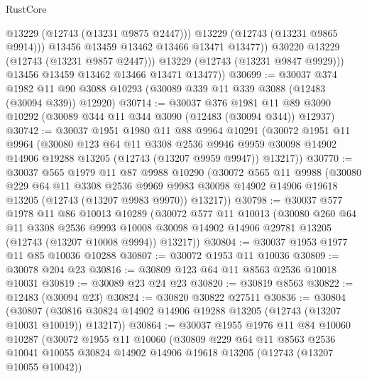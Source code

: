 \begin{lexlean}{RustCore}
\begin{coremodule}
                    @13229
                    (@12743 (@13231 @9875 @2447)))
                  @13229
                  (@12743 (@13231 @9865 @9914)))
                @13456
                @13459
                @13462
                @13466
                @13471
                @13477))
            @30220
            @13229
            (@12743 (@13231 @9857 @2447)))
          @13229
          (@12743 (@13231 @9847 @9929)))
        @13456
        @13459
        @13462
        @13466
        @13471
        @13477))
@30699 := @30037
    @374
    @1982
    @11
    @90
    @3088
    @10293
    (@30089 @339 @11 @339 @3088 (@12483 (@30094 @339)) @12920)
@30714 := @30037
    @376
    @1981
    @11
    @89
    @3090
    @10292
    (@30089 @344 @11 @344 @3090 (@12483 (@30094 @344)) @12937)
@30742 := @30037
    @1951
    @1980
    @11
    @88
    @9964
    @10291
    (@30072
      @1951
      @11
      @9964
      (@30080
        @123
        @64
        @11
        @3308
        @2536
        @9946
        @9959
        @30098
        @14902
        @14906
        @19288
        @13205
        (@12743 (@13207 @9959 @9947))
        @13217))
@30770 := @30037
    @565
    @1979
    @11
    @87
    @9988
    @10290
    (@30072
      @565
      @11
      @9988
      (@30080
        @229
        @64
        @11
        @3308
        @2536
        @9969
        @9983
        @30098
        @14902
        @14906
        @19618
        @13205
        (@12743 (@13207 @9983 @9970))
        @13217))
@30798 := @30037
    @577
    @1978
    @11
    @86
    @10013
    @10289
    (@30072
      @577
      @11
      @10013
      (@30080
        @260
        @64
        @11
        @3308
        @2536
        @9993
        @10008
        @30098
        @14902
        @14906
        @29781
        @13205
        (@12743 (@13207 @10008 @9994))
        @13217))
@30804 := @30037 @1953 @1977 @11 @85 @10036 @10288
@30807 := @30072 @1953 @11 @10036
@30809 := @30078 @204 @23
@30816 := @30809 @123 @64 @11 @8563 @2536 @10018 @10031
@30819 := @30089 @23 @24 @23
@30820 := @30819 @8563
@30822 := @12483 (@30094 @23)
@30824 := @30820 @30822 @27511
@30836 := @30804
    (@30807 (@30816 @30824 @14902 @14906 @19288 @13205 (@12743 (@13207 @10031 @10019)) @13217))
@30864 := @30037
    @1955
    @1976
    @11
    @84
    @10060
    @10287
    (@30072
      @1955
      @11
      @10060
      (@30809
        @229
        @64
        @11
        @8563
        @2536
        @10041
        @10055
        @30824
        @14902
        @14906
        @19618
        @13205
        (@12743 (@13207 @10055 @10042))

\end{coremodule}
\end{lexlean}

